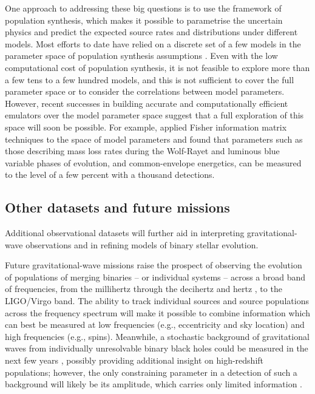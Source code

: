 \documentclass[review]{elsarticle}
\begin{document}
One approach to addressing these big questions is to use the framework of population synthesis, which makes it possible to parametrise the uncertain physics and predict the expected source rates and distributions under different models.  Most efforts to date have relied on a discrete set of a few models in the parameter space of population synthesis assumptions \citep[e.g.,][]{Dominik:2012,Stevenson:2015}.  Even with the low computational cost of population synthesis, it is not feasible to explore more than a few tens to a few hundred models, and this is not sufficient to cover the full parameter space or to consider the correlations between model parameters.  However, recent successes in building accurate and computationally efficient emulators over the model parameter space \citep{Barrett:2017,TaylorGerosa:2018,Wong:2020,Lin:2021} suggest that a full exploration of this space will soon be possible. For example, \citet{Barrett:2017FIM} applied Fisher information matrix techniques to the space of model parameters and found that parameters such as those describing mass loss rates during the Wolf-Rayet and luminous blue variable phases of evolution, and common-envelope energetics, can be measured to the level of a few percent with a thousand detections. 

\subsection{Other datasets and future missions}
Additional observational datasets will further aid in interpreting gravitational-wave observations and in refining models of binary stellar evolution.

Future gravitational-wave missions raise the prospect of observing the evolution of populations of merging binaries -- or individual systems -- across a broad band of frequencies, from the millihertz \citep[e.g.,][]{Sesana:2016} through the decihertz \citep{Mandel:2017} and hertz \citep{ET:2012}, to the LIGO/Virgo band.  The ability to track individual sources and source populations across the frequency spectrum will make it possible to combine information which can best be measured at low frequencies (e.g., eccentricity and sky location) and high frequencies (e.g., spins).  Meanwhile, a stochastic background of gravitational waves from individually unresolvable binary black holes could be measured in the next few years \citep{GW150914:stoch}, possibly providing additional insight on high-redshift populations; however, the only constraining parameter in a detection of such a background will likely be its amplitude, which carries only limited information \citep{Callister:2016}.
\end{document}
